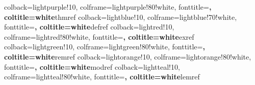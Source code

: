 %
{colback=lightpurple!10, colframe=lightpurple!80!white, fonttitle=\bfseries, coltitle=white}{thmref}
%
{colback=lightblue!10, colframe=lightblue!70!white, fonttitle=\bfseries, coltitle=white}{defref}
%
{colback=lightred!10, colframe=lightred!80!white, fonttitle=\bfseries, coltitle=white}{exref}
%
{colback=lightgreen!10, colframe=lightgreen!80!white, fonttitle=\bfseries, coltitle=white}{remref}
%
{colback=lightorange!10, colframe=lightorange!80!white, fonttitle=\bfseries, coltitle=white}{modref}
%
{colback=lightteal!10, colframe=lightteal!80!white, fonttitle=\bfseries, coltitle=white}{lemref}

\renewcommand{\qed}{\hspace*{\fill}\rule{7pt}{7pt}}
\newenvironment{proof_sketch}{\noindent{\bf Sketch of Proof} (Informal)\hspace*{1em}}{\qed\medskip}
\renewenvironment{proof}{\noindent{\bf Proof:}\hspace*{1em}}{\qed\medskip}
